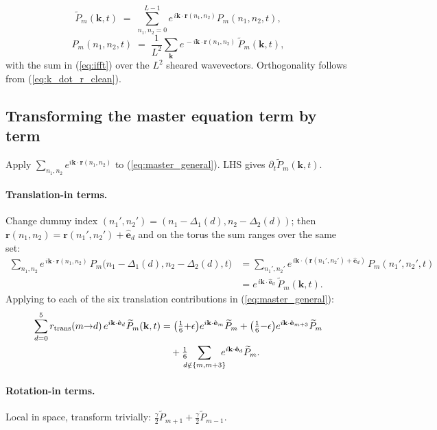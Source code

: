 \documentclass[11pt,a4paper]{article}
\newcommand{\nn}{\nonumber \\}
\newcommand{\vk}{\mathbf{k}}
\newcommand{\vr}{\mathbf{r}}
\newcommand{\veps}[1]{\hat{\mathbf{e}}_{#1}}
\newcommand{\Ptilde}{\widetilde{P}}
\begin{document}
\begin{equation}\label{eq:fft_pair}
\Ptilde_m(\vk, t) \;=\; \sum_{n_1, n_2 = 0}^{L-1} e^{\,i \vk \cdot \vr(n_1, n_2)} P_m(n_1, n_2, t),
\end{equation}
\begin{equation}\label{eq:ifft}
P_m(n_1, n_2, t) \;=\; \frac{1}{L^2}\sum_{\vk} e^{\,-i \vk \cdot \vr(n_1, n_2)}\, \Ptilde_m(\vk, t),
\end{equation}
with the sum in (\ref{eq:ifft}) over the $L^2$ sheared wavevectors.
Orthogonality follows from (\ref{eq:k_dot_r_clean}).

\subsection{Transforming the master equation term by term}\label{ssec:transform-stepwise}

Apply $\sum_{n_1, n_2} e^{i \vk \cdot \vr(n_1, n_2)}$ to (\ref{eq:master_general}). LHS gives $\partial_t \Ptilde_m(\vk, t)$.

\paragraph{Translation-in terms.} Change dummy index
$(n_1', n_2') = (n_1 - \Delta_1(d), n_2 - \Delta_2(d))$; then
$\vr(n_1, n_2) = \vr(n_1', n_2') + \veps{d}$ and on the torus the sum
ranges over the same set:
\begin{align}\label{eq:shift_step}
\sum_{n_1, n_2}\!\! e^{\,i \vk \cdot \vr(n_1, n_2)}\, P_m\!\big(n_1{-}\Delta_1(d), n_2{-}\Delta_2(d), t\big)
&= \sum_{n_1', n_2'}\!\! e^{\,i \vk \cdot (\vr(n_1', n_2') + \veps{d})}\, P_m(n_1', n_2', t) \nn
&= e^{\,i \vk \cdot \veps{d}}\, \Ptilde_m(\vk, t).
\end{align}
Applying to each of the six translation contributions in (\ref{eq:master_general}):
\begin{align}
\sum_{d=0}^{5} r_{\rm trans}(m{\to}d)\, e^{i \vk \cdot \veps{d}} \Ptilde_m(\vk, t)
&= \big(\tfrac{1}{6}{+}\epsilon\big) e^{i \vk \cdot \veps{m}} \Ptilde_m + \big(\tfrac{1}{6}{-}\epsilon\big) e^{i \vk \cdot \veps{m+3}} \Ptilde_m \nn
&\quad + \tfrac{1}{6}\!\!\!\!\sum_{d \notin \{m, m+3\}}\!\!\!\! e^{i \vk \cdot \veps{d}} \Ptilde_m.
\label{eq:trans_in_kspace}
\end{align}

\paragraph{Rotation-in terms.} Local in space, transform trivially:
$\tfrac{\gamma}{2} \Ptilde_{m+1} + \tfrac{\gamma}{2} \Ptilde_{m-1}$.
\end{document}
